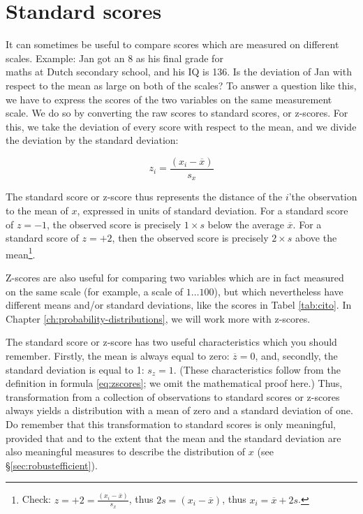 \documentclass[
]{book}
\begin{document}
\hypertarget{sec:standardscores}{%
\section{Standard scores}\label{sec:standardscores}}

It can sometimes be useful to compare scores which are measured on
different scales. Example: Jan got an 8 as his final grade for\\
maths at Dutch secondary school, and his IQ is 136. Is the deviation of Jan with
respect to the mean as large on both of the scales? To answer a question
like this, we have to express the scores of the two variables on the
same measurement scale. We do so by converting the raw scores to
standard scores, or z-scores. For this, we take the deviation of every
score with respect to the mean, and we divide the deviation by the
standard deviation:

\begin{equation}
    z_i = \frac{(x_i-\overline{x})}{s_x}
   \label{eq:zscores}
\end{equation}

The standard score or z-score
thus represents the distance of the \(i\)'the observation to the mean
of \(x\), expressed in units of standard deviation. For a
standard score of \(z=-1\), the observed score is precisely \(1 \times s\)
below the average \(\overline{x}\). For a standard score of \(z=+2\),
then the observed score is precisely \(2 \times s\) above the
mean\footnote{Check: \(z = +2 = \frac{(x_i-\overline{x})}{s_x}\), thus \(2 s = (x_i-\overline{x})\), thus \(x_i = \overline{x}+2s\).}.

Z-scores are also useful for comparing two variables which
are in fact measured on the same scale (for example, a scale of
\(1 \dots 100\)), but which nevertheless have different means and/or
standard deviations, like the scores in
Tabel \ref{tab:cito}.
In Chapter \ref{ch:probability-distributions}, we will work more with z-scores.

The standard score or z-score has two useful characteristics which you
should remember. Firstly, the mean is always equal to zero:
\(\overline{z}=0\), and, secondly, the standard deviation is equal to 1:
\(s_z = 1\). (These characteristics follow from the definition in
formula \eqref{eq:zscores}; we omit the mathematical proof here.) Thus,
transformation from a collection of observations to
standard scores or z-scores always yields a distribution with
a mean of zero and a standard deviation of one. Do remember that
this transformation to standard scores is only meaningful, provided that and
to the extent that the mean and the standard deviation are also meaningful measures
to describe the distribution of \(x\) (see §\ref{sec:robustefficient}).
\end{document}
